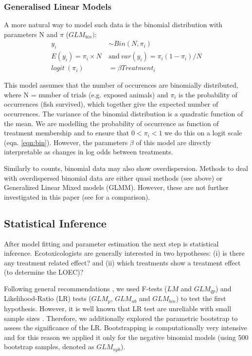 \documentclass[twocolumn, natbib]{svjour3}
\begin{document}
\subsubsection{Generalised Linear Models}
A more natural way to model such data is the  binomial distribution with parameters N and $\pi$ ($GLM_{bin})$:
\begin{align}
  y_i &\sim Bin(N, \pi_i) \nonumber \\
  E(y_i) = \pi_i \times N ~&\text{and}~var(y_i) =  \pi_i (1 - \pi_i) / N \label{eqn:bin} \\
  logit~(\pi_i) &= \beta Treatment_i \nonumber
  \end{align}

This model assumes that the number of occurences are binomially distributed, where N = number of trials (e.g. exposed animals) and $\pi_i$ is the probability of occurrences (fish survived), which together give the expected number of occurrences.
The variance of the binomial distribution is a quadratic function of the mean.
We are modelling the probability of occurrence as function of treatment membership and to ensure that $0 < \pi_i < 1$ we do this on a logit scale (eqn. \ref{eqn:bin}). 
However, the parameters $\beta$ of this model are directly interpretable as changes in log odds between treatments.

Similarly to counts, binomial data may also show overdispersion. 
Methods to deal with overdispersed binomial data are either quasi methods (see above) or Generalized Linear Mixed models (GLMM).
However, these are not further investigated in this paper (see \citet{warton_arcsine_2011} for a comparison).


\subsection{Statistical Inference}
After model fitting and parameter estimation the next step is statistical inference.
Ecotoxicologists are generally interested in two hypotheses: (i) is there any treatment related effect? and (ii) which treatments show a treatment effect (to determine the LOEC)?

Following general recommendations \citep{bolker_generalized_2009,faraway_extending_2006}, we used F-tests ($LM$ and $GLM_{qp}$) and Likeli\-hood-Ratio (LR) tests ($GLM_p$, $GLM_{nb}$ and $GLM_{bin}$) to test the first hypothesis.
However, it is well known that LR test are unreliable with small sample sizes \citep{wilks_large-sample_1938}.
Therefore, we additionally explored the parametric bootstrap \citep{faraway_extending_2006} to assess the significance of the LR.
Bootstrapping is computationally very intensive and for this reason we applied it only for the negative binomial models (using 500 bootstrap samples, denoted as $GLM_{npb}$).
\end{document}
